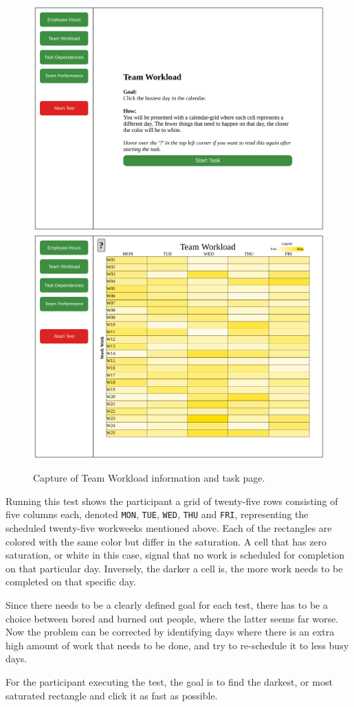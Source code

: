 \documentclass[nofilelist,dvipsnames]{cslthse-msc}
\begin{document}
{        \begin{figure}[h!]
          \centering
          \includegraphics[width=.49\textwidth]{figures/captures/webapp_team_workload_info.pdf}
          \includegraphics[width=.49\textwidth]{figures/captures/webapp_team_workload_task.pdf}
          \caption{Capture of Team Workload information and task page.}
        \end{figure}

        Running this test shows the participant a grid of twenty-five rows
        consisting of five columns each, denoted
        \texttt{MON},
        \texttt{TUE},
        \texttt{WED},
        \texttt{THU} and
        \texttt{FRI},
        representing the scheduled twenty-five workweeks mentioned above. Each
        of the rectangles are colored with the same color but differ in the
        saturation. A cell that has zero saturation, or white in this case,
        signal that no work is scheduled for completion on that particular day.
        Inversely, the darker a cell is, the more work needs to be completed on
        that specific day.

        Since there needs to be a clearly defined goal for each test, there has
        to be a choice between bored and burned out people, where the latter
        seems far worse. Now the problem can be corrected by identifying days
        where there is an extra high amount of work that needs to be done, and
        try to re-schedule it to less busy days.

        For the participant executing the test, the goal is to find the
        darkest, or most saturated rectangle and click it as fast as possible.

}
\end{document}
